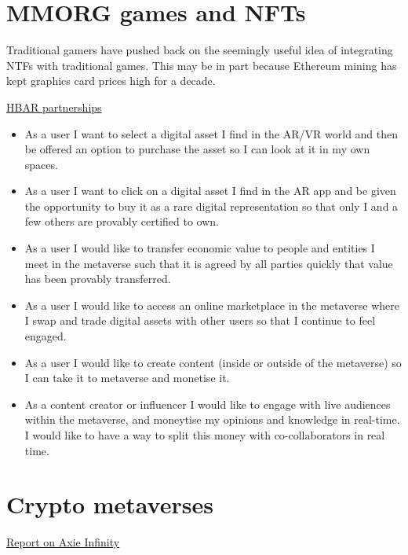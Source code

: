 \section{MMORG games and NFTs}
Traditional gamers have pushed back on the seemingly useful idea of integrating NTFs with traditional games. This may be in part because Ethereum mining has kept graphics card prices high for a decade.

\href{https://www.prnewswire.com/news-releases/hbar-foundation-and-ubisoft-partner-to-support-growth-of-gaming-on-hedera-network-301474971.html}{HBAR partnerships}
\label{behaviours}
\begin{itemize}
\item As a user I want to select a digital asset I find in the AR/VR world and then be offered an option to purchase the asset so I can look at it in my own spaces.
\item As a user I want to click on a digital asset I find in the AR app and be given the opportunity to buy it as a rare digital representation so that only I and a few others are provably certified to own.
\item As a user I would like to transfer economic value to people and entities I meet in the metaverse such that it is agreed by all parties quickly that value has been provably transferred.
\item As a user I would like to access an online marketplace in the metaverse where I swap and trade digital assets with other users so that I continue to feel engaged.
\item As a user I would like to create content (inside or outside of the metaverse) so I can take it to metaverse and monetise it.
\item As a content creator or influencer I would like to engage with live audiences within the metaverse, and moneytise my opinions and knowledge in real-time. I would like to have a way to split this money with co-collaborators in real time.
\end{itemize}
\section{Crypto metaverses}

\href{https://naavik.co/business-breakdowns/axie-infinity/#axie-decon=}{Report on Axie Infinity}


